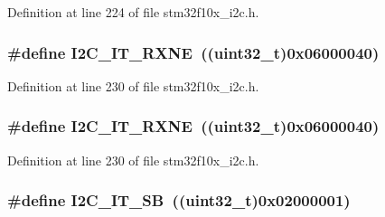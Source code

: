 Definition at line 224 of file stm32f10x\+\_\+i2c.\+h.

\subsubsection[{\texorpdfstring{I2\+C\+\_\+\+I\+T\+\_\+\+R\+X\+NE}{I2C_IT_RXNE}}]{\setlength{\rightskip}{0pt plus 5cm}\#define I2\+C\+\_\+\+I\+T\+\_\+\+R\+X\+NE~(({\bf uint32\+\_\+t})0x06000040)}\hypertarget{group___i2_c__interrupts__definition_gac95135720c0de2fd01c44c3f7b6c81d4}{}\label{group___i2_c__interrupts__definition_gac95135720c0de2fd01c44c3f7b6c81d4}


Definition at line 230 of file stm32f10x\+\_\+i2c.\+h.

\subsubsection[{\texorpdfstring{I2\+C\+\_\+\+I\+T\+\_\+\+R\+X\+NE}{I2C_IT_RXNE}}]{\setlength{\rightskip}{0pt plus 5cm}\#define I2\+C\+\_\+\+I\+T\+\_\+\+R\+X\+NE~(({\bf uint32\+\_\+t})0x06000040)}\hypertarget{group___i2_c__interrupts__definition_gac95135720c0de2fd01c44c3f7b6c81d4}{}\label{group___i2_c__interrupts__definition_gac95135720c0de2fd01c44c3f7b6c81d4}


Definition at line 230 of file stm32f10x\+\_\+i2c.\+h.

\subsubsection[{\texorpdfstring{I2\+C\+\_\+\+I\+T\+\_\+\+SB}{I2C_IT_SB}}]{\setlength{\rightskip}{0pt plus 5cm}\#define I2\+C\+\_\+\+I\+T\+\_\+\+SB~(({\bf uint32\+\_\+t})0x02000001)}\hypertarget{group___i2_c__interrupts__definition_gaec2fb9bbd0e1b128b4450b2a7b312896}{}\label{group___i2_c__interrupts__definition_gaec2fb9bbd0e1b128b4450b2a7b312896}


